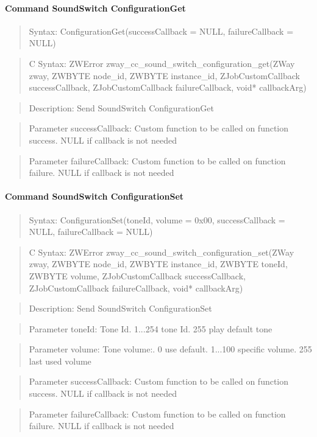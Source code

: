 \paragraph{Command SoundSwitch ConfigurationGet}
\begin{quote}Syntax: ConfigurationGet(successCallback = NULL, failureCallback = NULL)\end{quote}
\begin{quote}C Syntax: ZWError zway\_cc\_sound\_switch\_configuration\_get(ZWay zway, ZWBYTE node\_id, ZWBYTE instance\_id, ZJobCustomCallback successCallback, ZJobCustomCallback failureCallback, void* callbackArg)\end{quote}
\begin{quote}Description: Send SoundSwitch ConfigurationGet\end{quote}
\begin{quote}Parameter successCallback: Custom function to be called on function success. NULL if callback is not needed\end{quote}
\begin{quote}Parameter failureCallback: Custom function to be called on function failure. NULL if callback is not needed\end{quote}


\paragraph{Command SoundSwitch ConfigurationSet}
\begin{quote}Syntax: ConfigurationSet(toneId, volume = 0x00, successCallback = NULL, failureCallback = NULL)\end{quote}
\begin{quote}C Syntax: ZWError zway\_cc\_sound\_switch\_configuration\_set(ZWay zway, ZWBYTE node\_id, ZWBYTE instance\_id, ZWBYTE toneId, ZWBYTE volume, ZJobCustomCallback successCallback, ZJobCustomCallback failureCallback, void* callbackArg)\end{quote}
\begin{quote}Description: Send SoundSwitch ConfigurationSet\end{quote}
\begin{quote}Parameter toneId: Tone Id. 1...254 tone Id. 255 play default tone\end{quote}
\begin{quote}Parameter volume: Tone volume:. 0 use default. 1...100 specific volume. 255 last used volume\end{quote}
\begin{quote}Parameter successCallback: Custom function to be called on function success. NULL if callback is not needed\end{quote}
\begin{quote}Parameter failureCallback: Custom function to be called on function failure. NULL if callback is not needed\end{quote}



